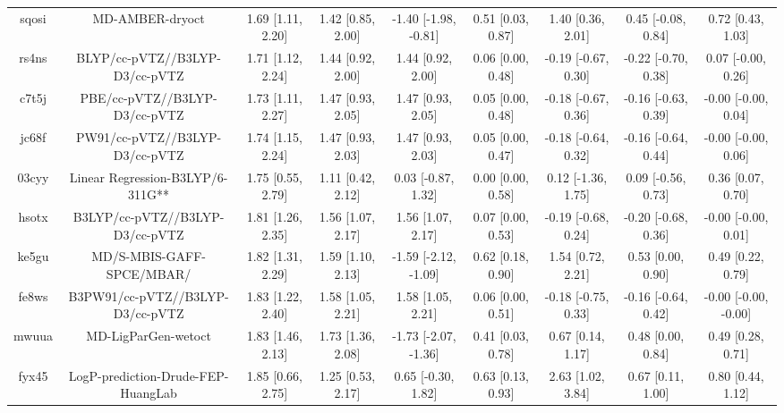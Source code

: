 \documentclass{article}
\begin{document}
\begin{center}
\begin{longtable}{|ccccccccc|}
 sqosi &                                    MD-AMBER-dryoct &  1.69 [1.11, 2.20] &  1.42 [0.85, 2.00] &  -1.40 [-1.98, -0.81] &  0.51 [0.03, 0.87] &    1.40 [0.36, 2.01] &   0.45 [-0.08, 0.84] &     0.72 [0.43, 1.03] \\
 rs4ns &                     BLYP/cc-pVTZ//B3LYP-D3/cc-pVTZ &  1.71 [1.12, 2.24] &  1.44 [0.92, 2.00] &     1.44 [0.92, 2.00] &  0.06 [0.00, 0.48] &  -0.19 [-0.67, 0.30] &  -0.22 [-0.70, 0.38] &    0.07 [-0.00, 0.26] \\
 c7t5j &                      PBE/cc-pVTZ//B3LYP-D3/cc-pVTZ &  1.73 [1.11, 2.27] &  1.47 [0.93, 2.05] &     1.47 [0.93, 2.05] &  0.05 [0.00, 0.48] &  -0.18 [-0.67, 0.36] &  -0.16 [-0.63, 0.39] &   -0.00 [-0.00, 0.04] \\
 jc68f &                     PW91/cc-pVTZ//B3LYP-D3/cc-pVTZ &  1.74 [1.15, 2.24] &  1.47 [0.93, 2.03] &     1.47 [0.93, 2.03] &  0.05 [0.00, 0.47] &  -0.18 [-0.64, 0.32] &  -0.16 [-0.64, 0.44] &   -0.00 [-0.00, 0.06] \\
 03cyy &                   Linear Regression-B3LYP/6-311G** &  1.75 [0.55, 2.79] &  1.11 [0.42, 2.12] &    0.03 [-0.87, 1.32] &  0.00 [0.00, 0.58] &   0.12 [-1.36, 1.75] &   0.09 [-0.56, 0.73] &     0.36 [0.07, 0.70] \\
 hsotx &                    B3LYP/cc-pVTZ//B3LYP-D3/cc-pVTZ &  1.81 [1.26, 2.35] &  1.56 [1.07, 2.17] &     1.56 [1.07, 2.17] &  0.07 [0.00, 0.53] &  -0.19 [-0.68, 0.24] &  -0.20 [-0.68, 0.36] &   -0.00 [-0.00, 0.01] \\
 ke5gu &                          MD/S-MBIS-GAFF-SPCE/MBAR/ &  1.82 [1.31, 2.29] &  1.59 [1.10, 2.13] &  -1.59 [-2.12, -1.09] &  0.62 [0.18, 0.90] &    1.54 [0.72, 2.21] &    0.53 [0.00, 0.90] &     0.49 [0.22, 0.79] \\
 fe8ws &                   B3PW91/cc-pVTZ//B3LYP-D3/cc-pVTZ &  1.83 [1.22, 2.40] &  1.58 [1.05, 2.21] &     1.58 [1.05, 2.21] &  0.06 [0.00, 0.51] &  -0.18 [-0.75, 0.33] &  -0.16 [-0.64, 0.42] &  -0.00 [-0.00, -0.00] \\
 mwuua &                                MD-LigParGen-wetoct &  1.83 [1.46, 2.13] &  1.73 [1.36, 2.08] &  -1.73 [-2.07, -1.36] &  0.41 [0.03, 0.78] &    0.67 [0.14, 1.17] &    0.48 [0.00, 0.84] &     0.49 [0.28, 0.71] \\
 fyx45 &                 LogP-prediction-Drude-FEP-HuangLab &  1.85 [0.66, 2.75] &  1.25 [0.53, 2.17] &    0.65 [-0.30, 1.82] &  0.63 [0.13, 0.93] &    2.63 [1.02, 3.84] &    0.67 [0.11, 1.00] &     0.80 [0.44, 1.12] \\

\end{longtable}
\end{center}
\end{document}
